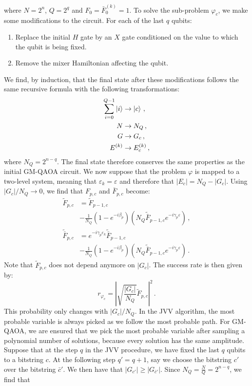 where $N=2^{n}$, $Q=2^{q}$ and $F_{0}=\bar{F}_{0}^{(k)}=1$. To solve the sub-problem $\varphi_{c}$, we make some modifications to the circuit. For each of the last $q$ qubits:
\begin{enumerate}
    \item Replace the initial $H$ gate by an $X$ gate conditioned on the value to which the qubit is being fixed.
    \item Remove the mixer Hamiltonian affecting the qubit.
\end{enumerate}
We find, by induction, that the final state after these modifications follows the same recursive formula with the following transformations:
\begin{align*}
    \sum_{i=0}^{Q-1} \ket{i} &\to \ket{c} \,, \\
    N &\to N_{Q} \,, \\
    G &\to G_{c} \,, \\
    E^{(k)} &\to E^{(k)}_{c} \,,
\end{align*}
where $N_{Q}=2^{n-q}$. The final state therefore conserves the same properties as the initial GM-QAOA circuit. We now suppose that the problem $\varphi$ is mapped to a two-level system, meaning that $\varepsilon_{k}=\varepsilon$ and therefore that $\lvert E_{c} \rvert = N_{Q} - \lvert G_{c} \rvert$. Using $\lvert G_{c} \rvert / N_{Q} \to 0$, we find that $F_{p,c}$ and $\bar{F}_{p,c}$ become:
\begin{equation}
\begin{aligned}
\tilde{F}_{p,c} &= \tilde{F}_{p-1,c} \\
&- \frac{1}{N_{Q}} (1-e^{-i\beta_{p}}) \left( N_{Q} \tilde{\bar{F}}_{p-1,c} e^{-i\gamma_{p}\varepsilon} \right) \,, \\
\tilde{\bar{F}}_{p, c} &= e^{-i\gamma_{p} \varepsilon_{k}} \tilde{\bar{F}}_{p-1, c} \\ 
&- \frac{1}{N_Q} (1-e^{-i\beta_{p}}) \left( N_{Q} \tilde{\bar{F}}_{p-1, c} e^{-i\gamma_{p}\varepsilon} \right) \,.
\end{aligned}
\end{equation}
Note that $\tilde{F}_{p,c}$ does not depend anymore on $\lvert G_{c} \rvert$. The success rate is then given by:
\begin{equation}
r_{\varphi_{c}} =  \left\lvert  \sqrt{ \frac{\lvert G_{c} \rvert }{N_{Q}} } \tilde{F}_{p, c} \right\rvert^{2} \,.
\end{equation}
This probability only changes with $\lvert G_{c} \rvert / N_{Q}$. In the JVV algorithm, the most probable variable is always picked as we follow the most probable path. For GM-QAOA, we are ensured that we pick the most probable variable after sampling a polynomial number of solutions, because every solution has the same amplitude. Suppose that at the step $q$ in the JVV procedure, we have fixed the last $q$ qubits to a bitstring $c$. At the following step $q'=q+1$, say we choose the bitstring $c'$ over the bitstring $\bar{c}'$. We then have that $\lvert G_{c'} \rvert \geq \lvert G_{\bar{c}'} \rvert$. Since $N_{Q} = \frac{N}{Q} = 2^{n-q}$, we find that
